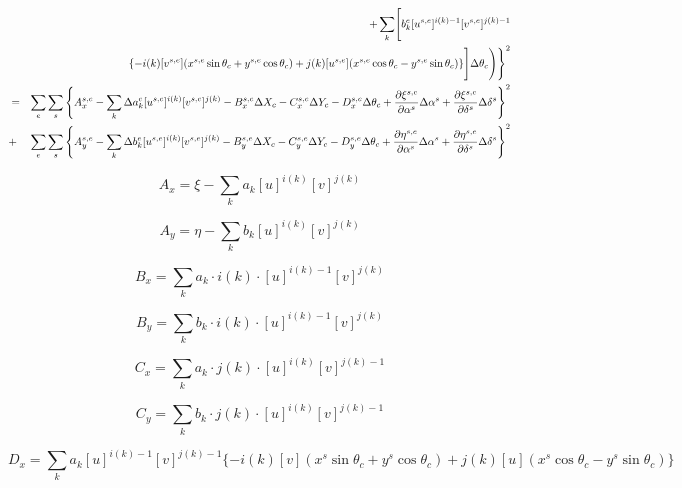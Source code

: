 \documentclass[12pt]{article}
\begin{document}
\begin{eqnarray}
&  & \hspace{1.0cm}+ \sum_k \Biggr[ b_k^e [u^{s,e}]^{i(k)-1} [v^{s,e}]^{j(k)-1}  \nonumber \\
& & \hspace{1.0cm} \{-i(k)[v^{s,e}](x^{s,e}\sin\theta_c+y^{s,e}\cos\theta_c)+j(k)[u^{s,e}](x^{s,e}\cos\theta_c-y^{s,e}\sin\theta_c) \} \Biggl] \Delta \theta_c \Biggr) \Biggr\}^2 \\
& = & \sum_e \sum_s \left\{ A_x^{s,e} - \sum_k \Delta a_k^e [u^{s,e}]^{i(k)} [v^{s,e}]^{j(k)} - B_x^{s,e} \Delta X_c - C_x^{s,e} \Delta Y_c -D_x^{s,e} \Delta\theta_c + \frac{\partial \xi^{s,e}}{\partial \alpha^{s}} \Delta\alpha^{s} + \frac{\partial \xi^{s,e}}{\partial \delta^{s}} \Delta\delta^{s} \right\}^2 \nonumber \\
& + & \sum_e \sum_s \left\{ A_y^{s,e} - \sum_k \Delta b_k^e [u^{s,e}]^{i(k)} [v^{s,e}]^{j(k)} - B_y^{s,e} \Delta X_c - C_y^{s,e} \Delta Y_c -D_y^{s,e} \Delta\theta_c + \frac{\partial \eta^{s,e}}{\partial \alpha^{s}} \Delta\alpha^{s} + \frac{\partial \eta^{s,e}}{\partial \delta^{s}} \Delta\delta^{s} \right\}^2 \nonumber \\
\end{eqnarray}

\begin{equation}
A_x = \xi - \sum_k a_k [u]^{i(k)} [v]^{j(k)}
\end{equation}

\begin{equation}
A_y = \eta - \sum_k b_k [u]^{i(k)} [v]^{j(k)}
\end{equation}

\begin{equation}
B_x = \sum_k a_k \cdot i(k) \cdot [u]^{i(k)-1} [v]^{j(k)}
\end{equation}

\begin{equation}
B_y = \sum_k b_k \cdot i(k) \cdot [u]^{i(k)-1} [v]^{j(k)}
\end{equation}

\begin{equation}
C_x = \sum_k a_k \cdot j(k) \cdot [u]^{i(k)} [v]^{j(k)-1}
\end{equation}

\begin{equation}
C_y = \sum_k b_k \cdot j(k) \cdot [u]^{i(k)} [v]^{j(k)-1}
\end{equation}

\begin{equation}
D_x = \sum_k a_k [u]^{i(k)-1} [v]^{j(k)-1} \{-i(k)[v](x^s\sin\theta_c+y^s\cos\theta_c)+j(k)[u](x^s\cos\theta_c-y^s\sin\theta_c) \} 
\end{equation}
\end{document}
